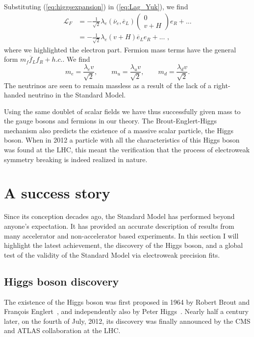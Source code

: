 Substituting (\ref{eq:higgsexpansion}) in (\ref{eq:Lag_Yuk}), we find 
\begin{align}
  \mathcal{L}_F &= - \frac{1}{\sqrt{2}} \lambda_e (\overline{\nu}_e, \overline{e}_L) 
		  \begin{pmatrix}0 \\ v+H \end{pmatrix} e_R + ... \\
                &= - \frac{1}{\sqrt{2}} \lambda_e (v+H) \overline{e}_L e_R + ... \textrm{ ,}
  \label{eq:yukawa}
\end{align}
where we highlighted the electron part. 
Fermion mass terms have the general form $m_f \overline{f}_L f_R + h.c.$. We find
\begin{equation}
m_e = \frac{\lambda_e v}{\sqrt{2}}, \qquad m_u = \frac{\lambda_u v}{\sqrt{2}}, \qquad m_d =
\frac{\lambda_d v}{\sqrt{2}}. \label{eq:fermion_masses}
\end{equation}
The neutrinos are seen to remain massless as a result of the lack of a right-handed neutrino in the
Standard Model. 

Using the same doublet of scalar fields we have thus successfully given mass to the gauge bosons and
fermions in our theory. The Brout-Englert-Higgs mechanism also predicts the existence of a massive
scalar particle, the Higgs boson. 
When in 2012 a particle with all the characteristics of this Higgs boson was found at the LHC, this
meant the verification that the process of electroweak symmetry breaking is indeed realized in
nature. 


\section{A success story \label{sec:SM_success}}

Since its conception decades ago, the Standard Model has performed beyond anyone's expectation. 
It has provided an accurate description of results from many accelerator and non-accelerator based
experiments. In this section I will highlight the latest achievement, the discovery of the Higgs
boson, and a global test of the validity of the Standard Model via electroweak precision fits. 

\subsection{Higgs boson discovery}

The existence of the Higgs boson was first proposed in 1964 by Robert Brout and Fran\c{c}ois
Englert~\cite{Englert:1964et}, and independently also by Peter Higgs~\cite{Higgs:1964pj}. Nearly
half a century later, on the fourth of July, 2012, its discovery was finally announced by the CMS
and ATLAS collaboration at the LHC.

